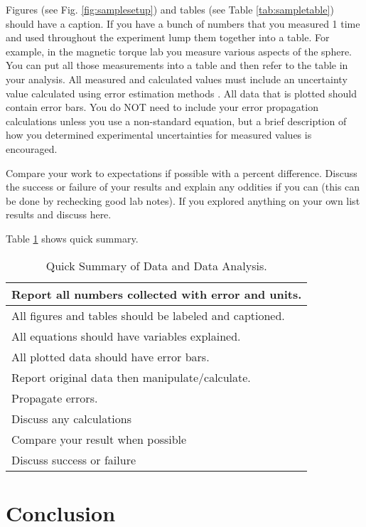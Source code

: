 \documentclass[twocolumn,secnumarabic,amssymb, nobibnotes, aps, pra]{revtex4}
\begin{document}
Figures (see Fig. \ref{fig:samplesetup}) and tables (see Table \ref{tab:sampletable}) should have a caption. If you have a bunch of numbers that you measured 1 time and used throughout the experiment lump them together into a table.  For example, in the magnetic torque lab you measure various aspects of the sphere.  You can put all those measurements into a table and then refer to the table in your analysis. All  measured and calculated values must include an uncertainty value calculated using error estimation methods \cite{taylor1997}. All data that is plotted should contain error bars. You do NOT need to include your error propagation calculations unless you use a non-standard equation, but a brief description of how you determined experimental uncertainties for measured values is encouraged.

Compare your work to expectations if possible with a percent difference.  Discuss the success or failure of your results and explain any oddities if you can (this can be done by rechecking good lab notes).  If you explored anything on your own list results and discuss here.  

Table \ref{tab:table2} shows quick summary.

\begin{table}
\caption{\label{tab:table1} Quick Summary of Data and Data Analysis.  }
\begin{ruledtabular}
\begin{tabular}{l}		
		\hline
		Report all numbers collected with error and \textbf{units}.\\ \hline
		All figures and tables should be labeled and captioned.\\ \hline
		All equations should have variables explained.\\ \hline
		All plotted data should have error bars.\\ \hline
		Report original data then manipulate/calculate.\\ \hline
		Propagate errors.\\ \hline
		Discuss any calculations\\ \hline
		Compare your result when possible\\ \hline
		Discuss success or failure \\

\end{tabular}
\end{ruledtabular}
\label{tab:table2}
\end{table}


\section{Conclusion}
\end{document}
